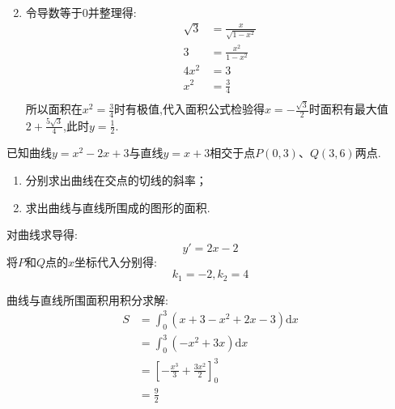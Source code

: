 \begin{questions}
\begin{solution}
\begin{enumerate}[label=\zhnum*、]
\begin{align*}
			      \end{align*}
			\item 令导数等于$0$并整理得:
			      \begin{align*}
				      \sqrt{3} & = \frac{x}{\sqrt{1-x^2}} \\
				      3        & = \frac{x^2}{1-x^2}      \\
				      4x^2     & = 3                      \\
				      x^2      & = \frac34                \\
			      \end{align*}
			      所以面积在$x^2 = \frac34$时有极值,代入面积公式检验得$x=-\frac{\sqrt{3}}{2}$时面积有最大值$2 +
				      \frac{5\sqrt{3}}{4}$,此时$y=\frac12$.
		\end{enumerate}
	\end{solution}

	\question 已知曲线$y=x^2-2x+3$与直线$y=x+3$相交于点$P(0,3)$、$Q(3,6)$两点.
	\begin{enumerate}[label=(\arabic*)]
		\item 分别求出曲线在交点的切线的斜率；
		\item 求出曲线与直线所围成的图形的面积.
	\end{enumerate}
	\begin{solution}
		对曲线求导得:
		\begin{equation*}
			y' = 2x - 2
		\end{equation*}
		将$P$和$Q$点的$x$坐标代入分别得:
		\begin{equation*}
			k_1 = -2, k_2 = 4
		\end{equation*}

		曲线与直线所围面积用积分求解:
		\begin{align*}
			S & = \int_0^3{(x + 3 - x^2 + 2x - 3)}\mathrm{d}x      \\
			  & = \int_0^3{(-x^2 + 3x)}\mathrm{d}x                 \\
			  & = \left[-\frac{x^3}{3} + \frac{3x^2}{2}\right]_0^3 \\
			  & = \frac92
		\end{align*}
	\end{solution}

\end{questions}
